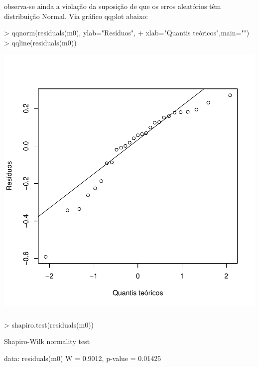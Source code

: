 \documentclass[14pt,aspectratio=1610]{beamer}
\begin{document}
\begin{frame}[fragile]{}
\frametitle{ }
\begin{block}{}
\justifying
observa-se ainda a violação da suposição de que os erros aleatórios têm distribuição
Normal. Via gráfico qqplot abaixo:
\begin{Schunk}
\begin{Sinput}
> qqnorm(residuals(m0), ylab="Resíduos",
+        xlab="Quantis teóricos",main="")
> qqline(residuals(m0))
\end{Sinput}
\end{Schunk}
\end{block}

\begin{block}{}
\vspace{-1cm}
\begin{center}
\includegraphics{Aula17-022}
\end{center}
\end{block}
\end{frame}

\begin{frame}[fragile]{}
\frametitle{ }
\begin{block}{}
\justifying
\begin{Schunk}
\begin{Sinput}
> shapiro.test(residuals(m0))
\end{Sinput}
\begin{Soutput}
	Shapiro-Wilk normality test

data:  residuals(m0)
W = 0.9012, p-value = 0.01425
\end{Soutput}
\end{Schunk}
\end{block}
\end{frame}
\end{document}
